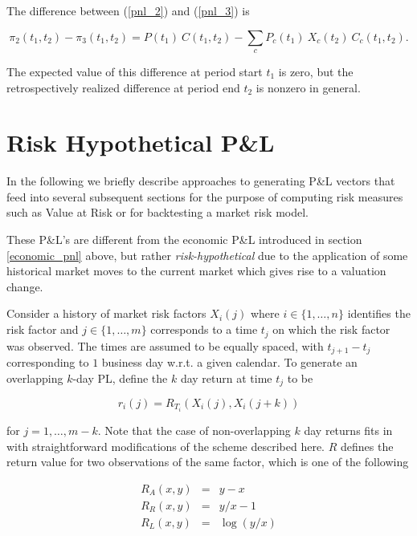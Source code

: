 The difference between (\ref{pnl_2}) and (\ref{pnl_3}) is

$$ \pi_2(t_1, t_2) - \pi_3(t_1, t_2) = P(t_1)\:C(t_1, t_2)
	- \sum_c P_c(t_1)\:X_c(t_2)\:C_c(t_1, t_2).
$$

The expected value of this difference at period start $t_1$ is zero, but the retrospectively realized difference at period end $t_2$ is nonzero in general.


\section{Risk Hypothetical P\&L}\label{sec:pl}

In the following we briefly describe approaches to generating P\&L
vectors that feed into several subsequent sections for the purpose of
computing risk measures such as Value at Risk or for backtesting a
market risk model.

These P\&L's are different from the economic P\&L introduced in
section \ref{economic_pnl} above, but rather {\em risk-hypothetical}
due to the application  of some historical market moves to the
current market which gives rise to a valuation change.


Consider a history of market risk factors $X_i(j)$ where $i\in\{1,\ldots,n\}$ identifies the risk factor and
$j\in\{1,\ldots,m\}$ corresponds to a time $t_j$ on which the risk factor was observed. The times are assumed to be
equally spaced, with $t_{j+1}-t_j$ corresponding to $1$ business day w.r.t. a given calendar. To generate an overlapping
$k$-day PL, define the $k$ day return at time $t_j$ to be

\begin{equation}\label{returns}
r_i(j) = R_{T_i}(X_i(j), X_{i}(j+k))
\end{equation}

for $j=1,\ldots,m-k$. Note that the case of non-overlapping $k$ day returns fits in with straightforward modifications
of the scheme described here. $R$ defines the return value for two observations of the same factor, which is one of the
following

\begin{eqnarray}
  R_A(x,y) &=& y-x \\
  R_R(x,y) &=& y/x - 1 \\
  R_L(x,y) &=& \log(y/x)
\end{eqnarray}

